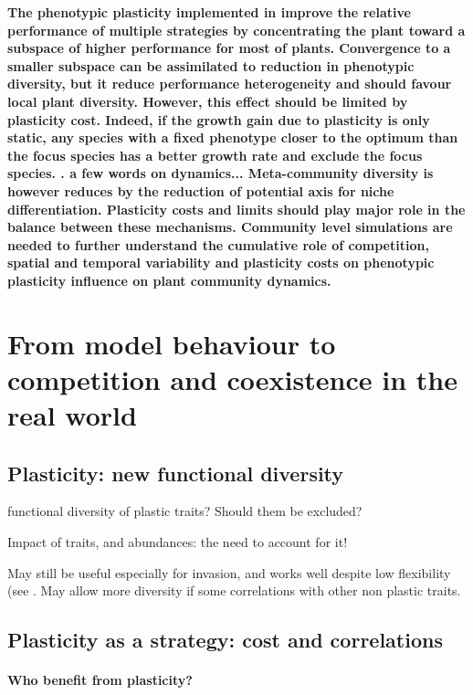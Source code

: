 \textbf{The phenotypic plasticity implemented in \model improve the relative performance of multiple strategies by concentrating the plant toward a subspace of higher performance for most of plants. Convergence to a smaller subspace can be assimilated to reduction in phenotypic diversity, but it reduce performance heterogeneity and should favour local plant diversity. However, this effect should be limited by plasticity cost. Indeed, if the growth gain due to plasticity is only static, any species with a fixed phenotype closer to the optimum than the focus species has a better growth rate and exclude the focus species.
. a few words on dynamics... Meta-community diversity is however reduces by the reduction of potential axis for niche differentiation. Plasticity costs and limits should play major role in the balance between these mechanisms. Community level simulations are needed to further understand the cumulative role of competition, spatial and temporal variability and plasticity costs on phenotypic plasticity influence on plant community dynamics.}


\section{From model behaviour to competition and coexistence in the real world}

\subsection{Plasticity: new functional diversity}

functional diversity of plastic traits? Should them be excluded?

Impact of traits, and abundances: the need to account for it!

May still be useful especially for invasion, and works well despite low flexibility (see \parencite{forsman_rethinking_2014}. May allow more diversity if some correlations with other non plastic traits.	

\subsection{Plasticity as a strategy: cost and correlations}

\paragraph{Who benefit from plasticity?}

